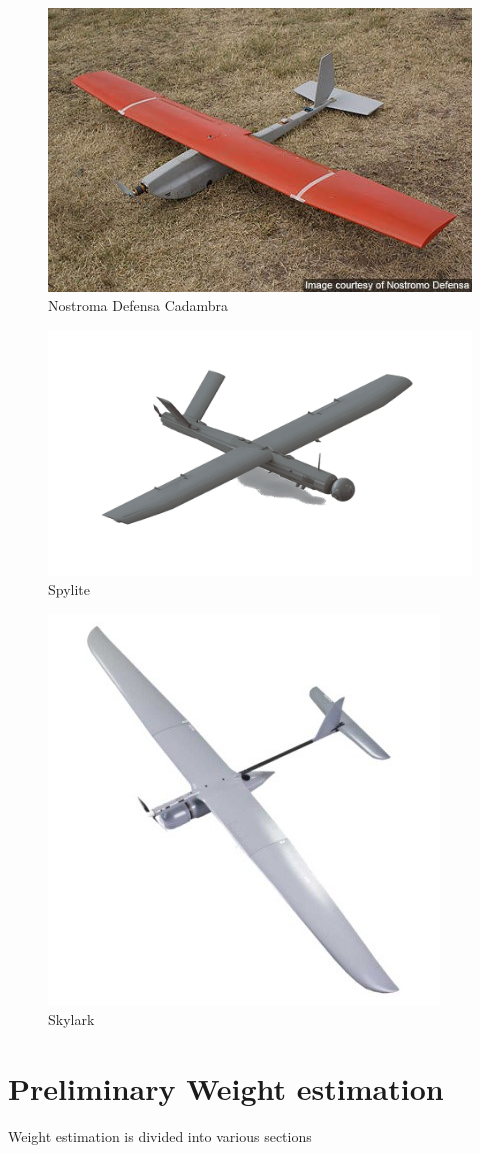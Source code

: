 \documentclass[12 pt]{article}
\begin{document}
\begin{figure}[h!]
    \centering
    \includegraphics[width=0.45\linewidth]{Aircraft pics/Nostroma.jpg}
    \caption{Nostroma Defensa Cadambra}
    \label{fig:enter-label}
\end{figure}

\begin{figure}[h]
    \centering
    \includegraphics[width=0.5\linewidth]{Aircraft pics/spylite.png}
    \caption{Spylite}
    \label{fig:enter-label}
\end{figure}

\begin{figure}[h]
    \centering
    \includegraphics[width=0.3\linewidth]{Aircraft pics/Skylark.jpg}
    \caption{Skylark}
    \label{fig:enter-label}
\end{figure}

\newpage


\section{Preliminary Weight estimation}

Weight estimation is divided into various sections
\end{document}
